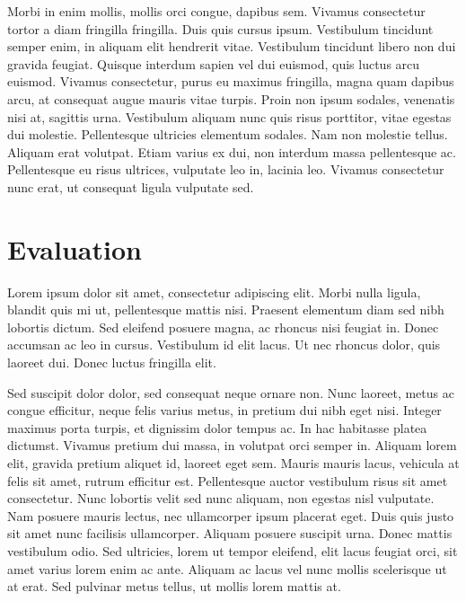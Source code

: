 \documentclass[a4paper, 11pt]{article}
\begin{document}
Morbi in enim mollis, mollis orci congue, dapibus sem. Vivamus consectetur tortor a diam fringilla fringilla. Duis quis cursus ipsum. Vestibulum tincidunt semper enim, in aliquam elit hendrerit vitae. Vestibulum tincidunt libero non dui gravida feugiat. Quisque interdum sapien vel dui euismod, quis luctus arcu euismod. Vivamus consectetur, purus eu maximus fringilla, magna quam dapibus arcu, at consequat augue mauris vitae turpis. Proin non ipsum sodales, venenatis nisi at, sagittis urna. Vestibulum aliquam nunc quis risus porttitor, vitae egestas dui molestie. Pellentesque ultricies elementum sodales. Nam non molestie tellus. Aliquam erat volutpat. Etiam varius ex dui, non interdum massa pellentesque ac. Pellentesque eu risus ultrices, vulputate leo in, lacinia leo. Vivamus consectetur nunc erat, ut consequat ligula vulputate sed.

\section{Evaluation}
Lorem ipsum dolor sit amet, consectetur adipiscing elit. Morbi nulla ligula, blandit quis mi ut, pellentesque mattis nisi. Praesent elementum diam sed nibh lobortis dictum. Sed eleifend posuere magna, ac rhoncus nisi feugiat in. Donec accumsan ac leo in cursus. Vestibulum id elit lacus. Ut nec rhoncus dolor, quis laoreet dui. Donec luctus fringilla elit.

Sed suscipit dolor dolor, sed consequat neque ornare non. Nunc laoreet, metus ac congue efficitur, neque felis varius metus, in pretium dui nibh eget nisi. Integer maximus porta turpis, et dignissim dolor tempus ac. In hac habitasse platea dictumst. Vivamus pretium dui massa, in volutpat orci semper in. Aliquam lorem elit, gravida pretium aliquet id, laoreet eget sem. Mauris mauris lacus, vehicula at felis sit amet, rutrum efficitur est. Pellentesque auctor vestibulum risus sit amet consectetur. Nunc lobortis velit sed nunc aliquam, non egestas nisl vulputate. Nam posuere mauris lectus, nec ullamcorper ipsum placerat eget. Duis quis justo sit amet nunc facilisis ullamcorper. Aliquam posuere suscipit urna. Donec mattis vestibulum odio. Sed ultricies, lorem ut tempor eleifend, elit lacus feugiat orci, sit amet varius lorem enim ac ante. Aliquam ac lacus vel nunc mollis scelerisque ut at erat. Sed pulvinar metus tellus, ut mollis lorem mattis at.
\end{document}
